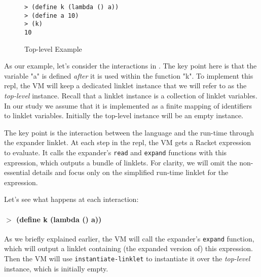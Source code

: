 \begin{wrapfigure}[9]{r}{0.3\textwidth}
  \vspace{-0.6cm}
  \begin{mdframed}
    \begin{verbatim}
> (define k (lambda () a))
> (define a 10)
> (k)
10
\end{verbatim}
    \caption{Top-level Example}
    \label{fig:toplevel-interaction}
  \end{mdframed}
\end{wrapfigure}

As our example, let's consider the interactions in
. The key point here is that the
variable "a" is defined \emph{after} it is used within the function
"k". To implement this repl, the VM will keep a dedicated linklet
instance that we will refer to as the \emph{top-level}
instance. Recall that a linklet instance is a collection of linklet
variables. In our study we assume that it is implemented as a finite
mapping of identifiers to linklet variables. Initially the top-level
instance will be an empty instance.

The key point is the interaction between the language and the run-time
through the expander linklet. At each step in the repl, the VM gets a
Racket expression to evaluate. It calls the expander's \verb|read| and
\verb|expand| functions with this expression, which outputs a bundle
of linklets. For clarity, we will omit the non-essential details and
focus only on the simplified run-time linklet for the expression.

Let's see what happens at each interaction:

\paragraph{$>$ (define k (lambda () a))}

As we briefly explained earlier, the VM will call the expander's
\verb|expand| function, which will output a linklet containing (the
expanded version of) this expression. Then the VM will use
\verb|instantiate-linklet| to instantiate it over the \emph{top-level}
instance, which is initially empty.

